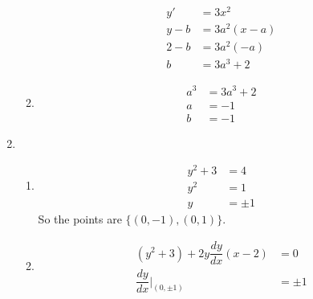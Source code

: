 \documentclass[12pt]{article}
\begin{document}
\begin{enumerate}
\begin{enumerate}
\begin{align*}
                y'&=3x^2\\
                y-b&=3a^2(x-a)\\
                2-b&=3a^2(-a)\\
                b&=3a^3+2
            \end{align*}
            \item \begin{align*}
                a^3&=3a^3+2\\
                a&=-1\\
                b&=-1
            \end{align*}
        \end{enumerate}
        \item \begin{enumerate}
            \item \begin{align*}
                y^2+3&=4\\
                y^2&=1\\
                y&=\pm 1
            \end{align*}
            So the points are $\{(0,-1),(0,1)\}$.
            \item \begin{align*}
                (y^2+3)+2y\dfrac{dy}{dx}(x-2)&=0\\
                \dfrac{dy}{dx}|_{(0,\pm 1)}&=\pm 1
            \end{align*}
        \end{enumerate}
    \end{enumerate}
\end{document}
